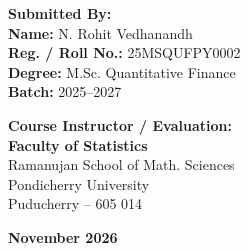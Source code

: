 \begin{titlepage}
\begin{center}
    \begin{minipage}{0.48\linewidth}
        \raggedright
        \textbf{Submitted By:}\\[4pt]
        \textbf{Name:} N. Rohit Vedhanandh\\[2pt]
        \textbf{Reg. / Roll No.:} 25MSQUFPY0002\\[2pt]
        \textbf{Degree:} M.Sc. Quantitative Finance\\[2pt]
        \textbf{Batch:} 2025--2027
    \end{minipage}
    \hfill
    \begin{minipage}{0.45\linewidth}
        \raggedleft
        \textbf{Course Instructor / Evaluation:}\\[4pt]
        \textbf{Faculty of Statistics}\\[2pt]
        Ramanujan School of Math. Sciences\\[2pt]
        Pondicherry University\\[2pt]
        Puducherry -- 605 014
    \end{minipage}

    \vfill

    {\normalsize\textbf{November 2026}}

\end{center}
\end{titlepage}
